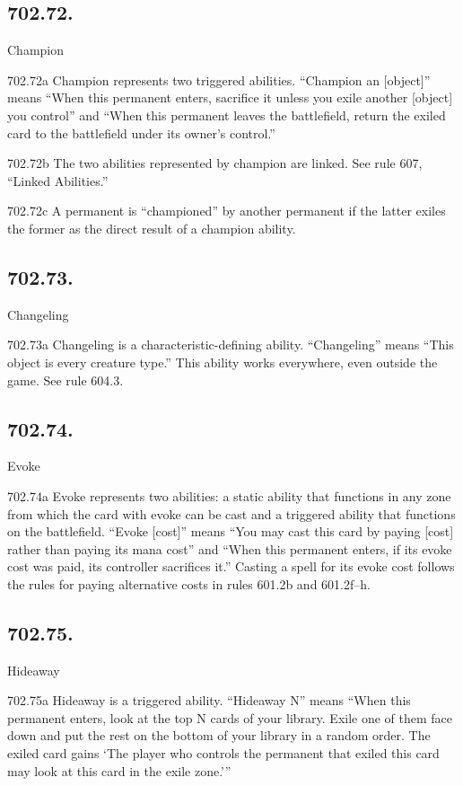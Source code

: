 \subsection*{702.72.}
Champion

702.72a Champion represents two triggered abilities. “Champion an [object]” means “When this permanent enters, sacrifice it unless you exile another [object] you control” and “When this permanent leaves the battlefield, return the exiled card to the battlefield under its owner’s control.”

702.72b The two abilities represented by champion are linked. See rule 607, “Linked Abilities.”

702.72c A permanent is “championed” by another permanent if the latter exiles the former as the direct result of a champion ability.

\subsection*{702.73.}
Changeling

702.73a Changeling is a characteristic-defining ability. “Changeling” means “This object is every creature type.” This ability works everywhere, even outside the game. See rule 604.3.

\subsection*{702.74.}
Evoke

702.74a Evoke represents two abilities: a static ability that functions in any zone from which the card with evoke can be cast and a triggered ability that functions on the battlefield. “Evoke [cost]” means “You may cast this card by paying [cost] rather than paying its mana cost” and “When this permanent enters, if its evoke cost was paid, its controller sacrifices it.” Casting a spell for its evoke cost follows the rules for paying alternative costs in rules 601.2b and 601.2f–h.

\subsection*{702.75.}
Hideaway

702.75a Hideaway is a triggered ability. “Hideaway N” means “When this permanent enters, look at the top N cards of your library. Exile one of them face down and put the rest on the bottom of your library in a random order. The exiled card gains ‘The player who controls the permanent that exiled this card may look at this card in the exile zone.’”

